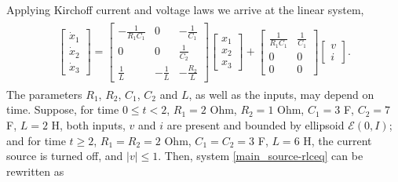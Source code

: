\documentclass[letterpaper,10pt,english]{sphinxmanual}
\begin{document}
Applying Kirchoff current and voltage laws we arrive at the linear
system,
\label{main_source:equation-rlceq}\begin{gather}
\begin{split}\left[\begin{array}{c}
\dot{x}_1\\
\dot{x}_2\\
\dot{x}_3\end{array}\right] = \left[\begin{array}{ccc}
-\frac{1}{R_1C_1} & 0 & -\frac{1}{C_1}\\
0 & 0 & \frac{1}{C_2}\\
\frac{1}{L} & -\frac{1}{L} & -\frac{R_2}{L}\end{array}\right]
\left[\begin{array}{c}
x_1\\
x_2\\
x_3\end{array}\right] + \left[\begin{array}{cc}
\frac{1}{R_1C_1} & \frac{1}{C_1}\\
0 & 0\\
0 & 0\end{array}\right]\left[\begin{array}{c}
v\\
i\end{array}\right].\end{split}\label{main_source-rlceq}
\end{gather}
The parameters $R_1$, $R_2$, $C_1$, $C_2$ and
$L$, as well as the inputs, may depend on time. Suppose, for time
$0\leqslant t<2$, $R_1=2$ Ohm, $R_2=1$ Ohm,
$C_1=3$ F, $C_2=7$ F, $L=2$ H, both inputs, $v$
and $i$ are present and bounded by ellipsoid
${\mathcal E}(0,I)$; and for time $t\geqslant2$,
$R_1=R_2=2$ Ohm, $C_1=C_2=3$ F, $L=6$ H, the current
source is turned off, and $|v|\leqslant1$. Then, system \eqref{main_source-rlceq}
can be rewritten as
\end{document}
